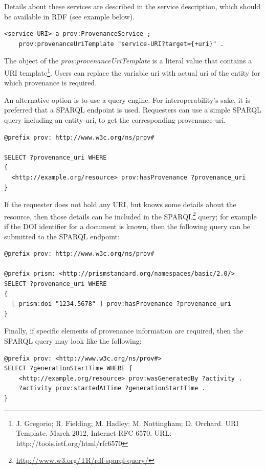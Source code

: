 Details about these services are described in the service description, which should be available in RDF (see example below).

\begin{verbatim}
<service-URI> a prov:ProvenanceService ;
    prov:provenanceUriTemplate "service-URI?target={+uri}" .
\end{verbatim}

The object of the \emph{prov:provenanceUriTemplate} is a literal value that contains a URI template\footnote{J. Gregorio; R. Fielding; M. Hadley; M. Nottingham; D. Orchard. URI Template. March 2012, Internet RFC 6570. URL: http://tools.ietf.org/html/rfc6570}. Users can replace the variable uri with actual uri of the entity for which provenance is required.

An alternative option is to use a query engine. For interoperability's sake, it is preferred that a SPARQL endpoint is used. Requesters can use a simple SPARQL query including an entity-uri, to get the corresponding provenance-uri.

\begin{verbatim}
@prefix prov: http://www.w3c.org/ns/prov#

SELECT ?provenance_uri WHERE
{
  <http://example.org/resource> prov:hasProvenance ?provenance_uri
}

\end{verbatim}

If the requester does not hold any URI, but knows some details about the resource, then those details can be included in the SPARQL\footnote{\url{http://www.w3.org/TR/rdf-sparql-query/}} query; for example if the DOI identifier for a document is known, then the following query can be submitted to the SPARQL  endpoint:

\begin{verbatim}
@prefix prov: http://www.w3c.org/ns/prov#

@prefix prism: <http://prismstandard.org/namespaces/basic/2.0/>
SELECT ?provenance_uri WHERE
{
  [ prism:doi "1234.5678" ] prov:hasProvenance ?provenance_uri
}
\end{verbatim}

Finally, if specific elements of provenance information are required, then the SPARQL query may look like the following:

\begin{verbatim}
@prefix prov: <http://www.w3c.org/ns/prov#>
SELECT ?generationStartTime WHERE {
    <http://example.org/resource> prov:wasGeneratedBy ?activity .
    ?activity prov:startedAtTime ?generationStartTime .
}

\end{verbatim}


